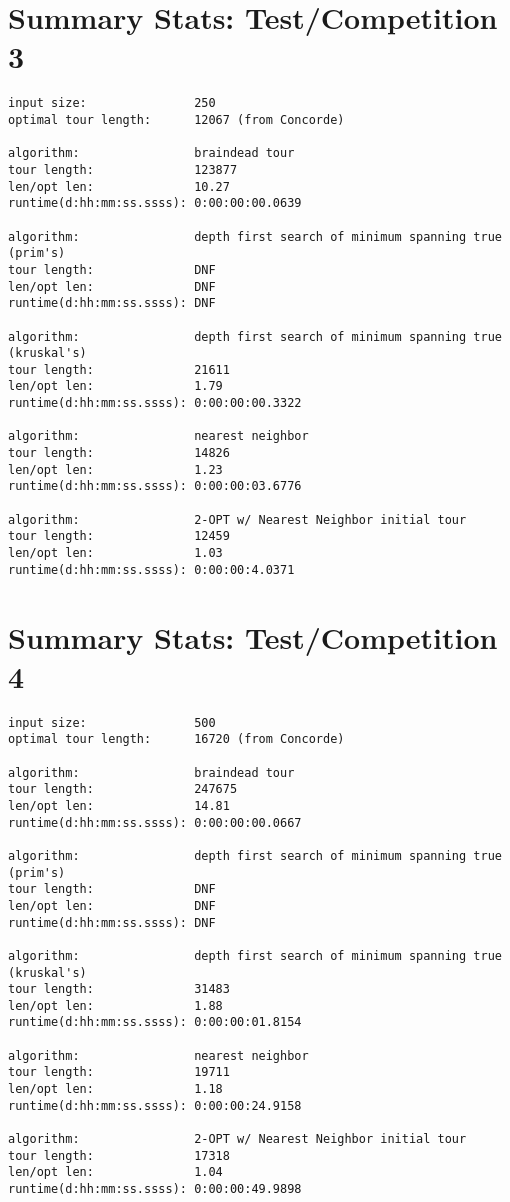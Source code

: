 \documentclass[12pt]{article}
\begin{document}
\newpage
\section*{Summary Stats: Test/Competition 3}
\begin{verbatim}
input size:               250
optimal tour length:      12067 (from Concorde)

algorithm:                braindead tour
tour length:              123877
len/opt len:              10.27
runtime(d:hh:mm:ss.ssss): 0:00:00:00.0639

algorithm:                depth first search of minimum spanning true (prim's) 
tour length:              DNF
len/opt len:              DNF
runtime(d:hh:mm:ss.ssss): DNF

algorithm:                depth first search of minimum spanning true (kruskal's) 
tour length:              21611
len/opt len:              1.79
runtime(d:hh:mm:ss.ssss): 0:00:00:00.3322

algorithm:                nearest neighbor 
tour length:              14826
len/opt len:              1.23
runtime(d:hh:mm:ss.ssss): 0:00:00:03.6776

algorithm:                2-OPT w/ Nearest Neighbor initial tour
tour length:              12459
len/opt len:              1.03
runtime(d:hh:mm:ss.ssss): 0:00:00:4.0371
\end{verbatim}

\newpage
\section*{Summary Stats: Test/Competition 4}
\begin{verbatim}
input size:               500
optimal tour length:      16720 (from Concorde)

algorithm:                braindead tour
tour length:              247675
len/opt len:              14.81
runtime(d:hh:mm:ss.ssss): 0:00:00:00.0667

algorithm:                depth first search of minimum spanning true (prim's) 
tour length:              DNF
len/opt len:              DNF
runtime(d:hh:mm:ss.ssss): DNF

algorithm:                depth first search of minimum spanning true (kruskal's) 
tour length:              31483
len/opt len:              1.88
runtime(d:hh:mm:ss.ssss): 0:00:00:01.8154

algorithm:                nearest neighbor 
tour length:              19711
len/opt len:              1.18
runtime(d:hh:mm:ss.ssss): 0:00:00:24.9158

algorithm:                2-OPT w/ Nearest Neighbor initial tour
tour length:              17318
len/opt len:              1.04
runtime(d:hh:mm:ss.ssss): 0:00:00:49.9898
\end{verbatim}
\end{document}
